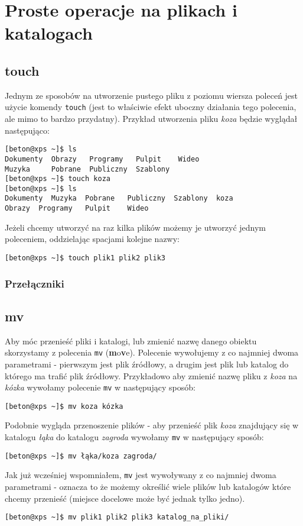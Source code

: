 \documentclass[10 pt, a4paper, draft]{report}
\begin{document}
\section{Proste operacje na plikach i katalogach}
\subsection{touch}
Jednym ze sposobów na utworzenie pustego pliku z poziomu wiersza poleceń jest użycie komendy \texttt{touch} (jest to właściwie efekt uboczny działania tego polecenia, ale mimo to bardzo przydatny). Przykład utworzenia pliku \textit{koza} będzie wyglądał następująco:
\begin{verbatim}
[beton@xps ~]$ ls
Dokumenty  Obrazy   Programy   Pulpit    Wideo
Muzyka     Pobrane  Publiczny  Szablony
[beton@xps ~]$ touch koza
[beton@xps ~]$ ls
Dokumenty  Muzyka  Pobrane   Publiczny  Szablony  koza
Obrazy  Programy   Pulpit    Wideo
\end{verbatim}
Jeżeli chcemy utworzyć na raz kilka plików możemy je utworzyć jednym poleceniem, oddzielając spacjami kolejne nazwy:
\begin{verbatim}
[beton@xps ~]$ touch plik1 plik2 plik3
\end{verbatim}
\subsubsection*{Przełączniki}

\subsection{mv}
Aby móc przenieść pliki i katalogi, lub zmienić nazwę danego obiektu skorzystamy z polecenia \texttt{mv} (\textbf{m}o\textbf{v}e). Polecenie wywołujemy z co najmniej dwoma parametrami - pierwszym jest plik źródłowy, a drugim jest plik lub katalog do którego ma trafić plik źródłowy. Przykładowo aby zmienić nazwę pliku z \textit{koza} na \textit{kózka} wywołamy polecenie \texttt{mv} w następujący sposób:
\begin{verbatim}
[beton@xps ~]$ mv koza kózka
\end{verbatim}
Podobnie wygląda przenoszenie plików - aby przenieść plik \textit{koza} znajdujący się w katalogu \textit{łąka} do katalogu \textit{zagroda} wywołamy \texttt{mv} w następujący sposób:
\begin{verbatim}
[beton@xps ~]$ mv łąka/koza zagroda/
\end{verbatim}
Jak już wcześniej wspomniałem, \texttt{mv} jest wywoływany z co najmniej dwoma parametrami - oznacza to że możemy określić wiele plików lub katalogów które chcemy przenieść (miejsce docelowe może być jednak tylko jedno).
\begin{verbatim}
[beton@xps ~]$ mv plik1 plik2 plik3 katalog_na_pliki/
\end{verbatim}
\end{document}
